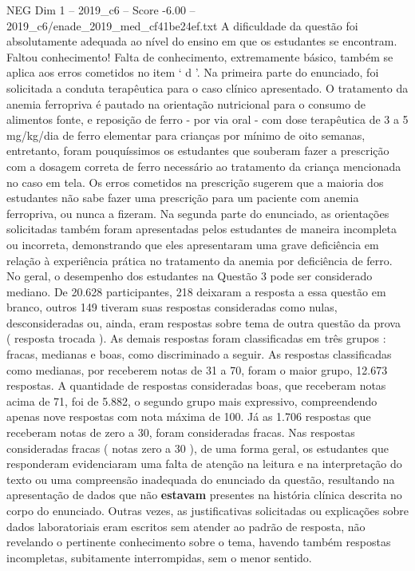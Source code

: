 \begin{textsample}{NEG Dim 1 – 2019\_c6 – Score -6.00 – 2019\_c6/enade\_2019\_med\_cf41be24ef.txt}
A dificuldade da questão foi absolutamente adequada ao nível do ensino em que os estudantes se encontram.
Faltou conhecimento!
Falta de conhecimento, extremamente básico, também se aplica aos erros cometidos no item ‘ d ’.
Na primeira parte do enunciado, foi solicitada a conduta terapêutica para o caso clínico apresentado.
O tratamento da anemia ferropriva é pautado na orientação nutricional para o consumo de alimentos fonte, e reposição de ferro - por via oral - com dose terapêutica de 3 a 5 mg/kg/dia de ferro elementar para crianças por mínimo de oito semanas, entretanto, foram pouquíssimos os estudantes que souberam fazer a prescrição com a dosagem correta de ferro necessário ao tratamento da criança mencionada no caso em tela.
Os erros cometidos na prescrição sugerem que a maioria dos estudantes não sabe fazer uma prescrição para um paciente com anemia ferropriva, ou nunca a fizeram.
Na segunda parte do enunciado, as orientações solicitadas também foram apresentadas pelos estudantes de maneira incompleta ou incorreta, demonstrando que eles apresentaram uma grave deficiência em relação à experiência prática no tratamento da anemia por deficiência de ferro.
No geral, o desempenho dos estudantes na Questão 3 pode ser considerado mediano.
De 20.628 participantes, 218 deixaram a resposta a essa questão em branco, outros 149 tiveram suas respostas consideradas como nulas, desconsideradas ou, ainda, eram respostas sobre tema de outra questão da prova ( resposta trocada ).
As demais respostas foram classificadas em três grupos : fracas, medianas e boas, como discriminado a seguir.
As respostas classificadas como medianas, por receberem notas de 31 a 70, foram o maior grupo, 12.673 respostas.
A quantidade de respostas consideradas boas, que receberam notas acima de 71, foi de 5.882, o segundo grupo mais expressivo, compreendendo apenas nove respostas com nota máxima de 100.
Já as 1.706 respostas que receberam notas de zero a 30, foram consideradas fracas.
Nas respostas consideradas fracas ( notas zero a 30 ), de uma forma geral, os estudantes que responderam evidenciaram uma falta de atenção na leitura e na interpretação do texto ou uma compreensão inadequada do enunciado da questão, resultando na apresentação de dados que não \textbf{estavam} presentes na história clínica descrita no corpo do enunciado.
Outras vezes, as justificativas solicitadas ou explicações sobre dados laboratoriais eram escritos sem atender ao padrão de resposta, não revelando o pertinente conhecimento sobre o tema, havendo também respostas incompletas, subitamente interrompidas, sem o menor sentido.

\end{textsample}

